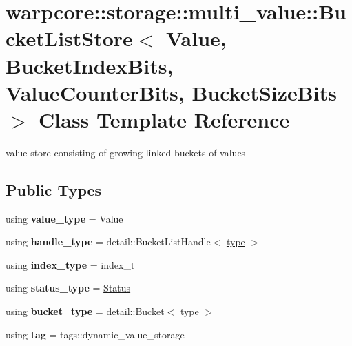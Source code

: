 \hypertarget{classwarpcore_1_1storage_1_1multi__value_1_1BucketListStore}{}\section{warpcore\+:\+:storage\+:\+:multi\+\_\+value\+:\+:Bucket\+List\+Store$<$ Value, Bucket\+Index\+Bits, Value\+Counter\+Bits, Bucket\+Size\+Bits $>$ Class Template Reference}
\label{classwarpcore_1_1storage_1_1multi__value_1_1BucketListStore}


value store consisting of growing linked buckets of values  


\subsection*{Public Types}
\begin{DoxyCompactItemize}
\item 
\mbox{\label{classwarpcore_1_1storage_1_1multi__value_1_1BucketListStore_a2512098bcea6ee1152181d1ae8de51ec}} 
using {\bfseries value\+\_\+type} = Value
\item 
\mbox{\label{classwarpcore_1_1storage_1_1multi__value_1_1BucketListStore_ae98832f52fcf3a9041da4c4c58fe241c}} 
using {\bfseries handle\+\_\+type} = detail\+::\+Bucket\+List\+Handle$<$ \hyperlink{classwarpcore_1_1storage_1_1multi__value_1_1BucketListStore}{type} $>$
\item 
\mbox{\label{classwarpcore_1_1storage_1_1multi__value_1_1BucketListStore_a8ddae8bb11348d8482f293ad86f0d398}} 
using {\bfseries index\+\_\+type} = index\+\_\+t
\item 
\mbox{\label{classwarpcore_1_1storage_1_1multi__value_1_1BucketListStore_a3d7e43d2e90f568d595f8fcc87bef0c6}} 
using {\bfseries status\+\_\+type} = \hyperlink{classwarpcore_1_1Status}{Status}
\item 
\mbox{\label{classwarpcore_1_1storage_1_1multi__value_1_1BucketListStore_a0679b15a6c3bed32ac3445296a05e8dd}} 
using {\bfseries bucket\+\_\+type} = detail\+::\+Bucket$<$ \hyperlink{classwarpcore_1_1storage_1_1multi__value_1_1BucketListStore}{type} $>$
\item 
\mbox{\label{classwarpcore_1_1storage_1_1multi__value_1_1BucketListStore_ae74350cef2adb6ddc7a21dbdf93e075e}} 
using {\bfseries tag} = tags\+::dynamic\+\_\+value\+\_\+storage
\end{DoxyCompactItemize}
